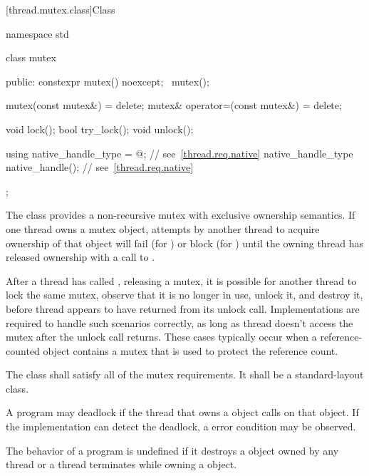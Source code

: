 [thread.mutex.class]{Class }

%
\begin{codeblock}
namespace std {
  class mutex {
  public:
    constexpr mutex() noexcept;
    ~mutex();

    mutex(const mutex&) = delete;
    mutex& operator=(const mutex&) = delete;

    void lock();
    bool try_lock();
    void unlock();

    using native_handle_type = @\impdefnc@;          // see~\ref{thread.req.native}
    native_handle_type native_handle();                         // see~\ref{thread.req.native}
  };
}
\end{codeblock}

\pnum
The class  provides a non-recursive mutex with exclusive ownership
semantics. If one thread owns a mutex object, attempts by another thread to acquire
ownership of that object will fail (for ) or block (for
) until the owning thread has released ownership with a call to
.

\pnum
\begin{note}
After a thread  has called , releasing a mutex, it is possible for another
thread  to lock the same mutex, observe that it is no longer in use, unlock it, and
destroy it, before thread  appears to have returned from its unlock call. Implementations
are required to handle such scenarios correctly, as long as thread  doesn't access the
mutex after the unlock call returns. These cases typically occur when a reference-counted object
contains a mutex that is used to protect the reference count.
\end{note}

\pnum
The class  shall satisfy all of the mutex
requirements. It shall be a standard-layout
class.

\pnum
\begin{note} A program may deadlock if the thread that owns a  object calls
 on that object. If the implementation can detect the deadlock,
a  error condition may be observed. \end{note}

\pnum
The behavior of a program is undefined if
it destroys a  object owned by any thread or
a thread terminates while owning a  object.

